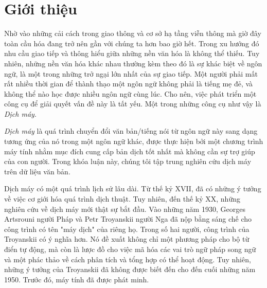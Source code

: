 
\chapter{Giới thiệu }
\ifpdf
    \graphicspath{{Chapter1/Chapter1Figs/PNG/}{Chapter1/Chapter1Figs/PDF/}{Chapter1/Chapter1Figs/}}
\else
    \graphicspath{{Chapter1/Chapter1Figs/EPS/}{Chapter1/Chapter1Figs/}}
\fi

Nhờ vào những cải cách trong giao thông và cơ sở hạ tầng viễn thông mà giờ đây toàn cầu hóa đang trở nên gần với chúng ta hơn bao giờ hết. Trong xu hướng đó nhu cầu giao tiếp và thông hiểu giữa những nền văn hóa là không thể thiếu. Tuy nhiên, những nền văn hóa khác nhau thường kèm theo đó là sự khác biệt về ngôn ngữ, là một trong những trở ngại lớn nhất của sự giao tiếp. Một người phải mất rất nhiều thời gian để thành thạo một ngôn ngữ không phải là tiếng mẹ đẻ, và không thể nào học được nhiều ngôn ngữ cùng lúc. Cho nên, việc phát triển một công cụ để giải quyết vấn đề này là tất yếu. Một trong những công cụ như vậy là \textit{Dịch máy}.

\textit{Dịch máy} là quá trình chuyển đổi văn bản/tiếng nói từ ngôn ngữ này sang dạng tương ứng của nó trong một ngôn ngữ khác, được thực hiện bởi một chương trình máy tính nhằm mục đích cung cấp bản dịch tốt nhất mà không cần sự trợ giúp của con người. Trong khóa luận này, chúng tôi tập trung nghiên cứu dịch máy trên dữ liệu văn bản.

Dịch máy có một quá trình lịch sử lâu dài. Từ thế kỷ XVII, đã có những ý tưởng về việc cơ giới hóa quá trình dịch thuật. Tuy nhiên, đến thế kỷ XX, những nghiên cứu về dịch máy mới thật sự bắt đầu. Vào những năm 1930, Georges Artsrouni người Pháp và Petr Troyanskii người Nga đã nộp bằng sáng chế cho công trình có tên "máy dịch" của riêng họ. Trong số hai người, công trình của Troyanskii có ý nghĩa hơn. Nó đề xuất không chỉ một phương pháp cho bộ từ điển tự động, mà còn là lược đồ cho việc mã hóa các vai trò ngữ pháp song ngữ và một phác thảo về cách phân tích và tổng hợp có thể hoạt động. Tuy nhiên, những ý tưởng của Troyanskii đã không được biết đến cho đến cuối những năm 1950. Trước đó, máy tính đã được phát minh.


